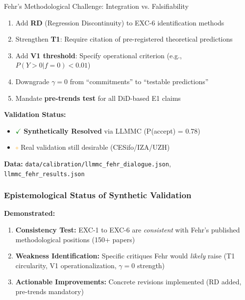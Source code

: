 \begin{chapter}{Fehr's Methodological Challenge: Integration vs. Falsifiability}
\begin{tcolorbox}[colback=orange!5!white,colframe=orange!75!black,title=\textbf{Recommended Revisions (from LLMMC)}]
\begin{enumerate}[noitemsep]
    \item Add \textbf{RD} (Regression Discontinuity) to EXC-6 identification methods
    \item Strengthen \textbf{T1}: Require citation of pre-registered theoretical predictions
    \item Add \textbf{V1 threshold}: Specify operational criterion (e.g., $P(Y>0|f=0) < 0.01$)
    \item Downgrade \textbf{$\gamma = 0$} from ``commitments'' to ``testable predictions''
    \item Mandate \textbf{pre-trends test} for all DiD-based E1 claims
\end{enumerate}
\end{tcolorbox}

\textbf{Validation Status:}
\begin{itemize}[noitemsep]
    \item \textcolor{green}{$\checkmark$} \textbf{Synthetically Resolved} via LLMMC (P(accept) = 0.78)
    \item \textcolor{orange}{$\circ$} Real validation still desirable (CESifo/IZA/UZH)
\end{itemize}

\textbf{Data:} \texttt{data/calibration/llmmc\_fehr\_dialogue.json}, \texttt{llmmc\_fehr\_results.json}

\subsubsection{Epistemological Status of Synthetic Validation}
\label{sec:llmmc-epistemology}

\begin{tcolorbox}[colback=blue!5!white,colframe=blue!75!black,title=\textbf{What LLMMC Synthetic Validation Shows}]
\textbf{Demonstrated:}
\begin{enumerate}[noitemsep]
    \item \textbf{Consistency Test:} EXC-1 to EXC-6 are \textit{consistent} with Fehr's published methodological positions (150+ papers)
    \item \textbf{Weakness Identification:} Specific critiques Fehr would \textit{likely} raise (T1 circularity, V1 operationalization, $\gamma=0$ strength)
    \item \textbf{Actionable Improvements:} Concrete revisions implemented (RD added, pre-trends mandatory)
\end{enumerate}


\end{tcolorbox}
\end{chapter}

